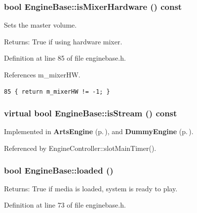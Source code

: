 \subsubsection{\setlength{\rightskip}{0pt plus 5cm}bool Engine\-Base::is\-Mixer\-Hardware () const\hspace{0.3cm}{\tt  [inline]}}\label{classEngineBase_EngineBasea11}


Sets the master volume. \begin{Desc}
\item[Returns:]True if using hardware mixer. \end{Desc}


Definition at line 85 of file enginebase.h.

References m\_\-mixer\-HW.



\footnotesize\begin{verbatim}85 { return m_mixerHW != -1; }
\end{verbatim}\normalsize 
{}
\subsubsection{\setlength{\rightskip}{0pt plus 5cm}virtual bool Engine\-Base::is\-Stream () const\hspace{0.3cm}{\tt  [pure virtual]}}\label{classEngineBase_EngineBasea12}




Implemented in {\bf Arts\-Engine} {\rm (p.\,\pageref{classArtsEngine_ArtsEnginea8})}, and {\bf Dummy\-Engine} {\rm (p.\,\pageref{classDummyEngine_DummyEngined6})}.

Referenced by Engine\-Controller::slot\-Main\-Timer().
\subsubsection{\setlength{\rightskip}{0pt plus 5cm}bool Engine\-Base::loaded ()\hspace{0.3cm}{\tt  [inline]}}\label{classEngineBase_EngineBasea9}


\begin{Desc}
\item[Returns:]True if media is loaded, system is ready to play. \end{Desc}


Definition at line 73 of file enginebase.h.

